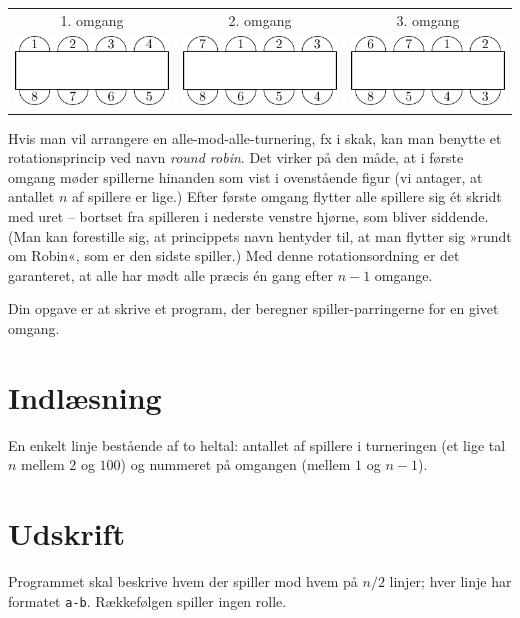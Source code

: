 
\begin{tabular}{ccc}
  1. omgang & 2. omgang & 3. omgang\\[1ex]
  \includegraphics{img/turnering-img-1.pdf} &
  \includegraphics{img/turnering-img-2.pdf} &
  \includegraphics{img/turnering-img-3.pdf} 
\end{tabular}
\bigskip

Hvis man vil arrangere en alle-mod-alle-turnering, fx i skak, kan man benytte et rotationsprincip ved navn \emph{round robin}.
Det virker på den måde, at i første omgang møder spillerne hinanden som vist i ovenstående figur (vi antager, at antallet $n$ af spillere er lige.)
Efter første omgang flytter alle spillere sig ét skridt med uret -- bortset fra spilleren i nederste venstre hjørne, som bliver siddende.
(Man kan forestille sig, at princippets navn hentyder til, at man flytter sig »rundt om Robin«, som er den sidste spiller.) 
Med denne rotationsordning er det garanteret, at alle har mødt alle præcis én gang efter $n-1$ omgange.

Din opgave er at skrive et program, der beregner spiller-parringerne for en givet omgang.

\section*{Indlæsning}
En enkelt linje bestående af to heltal: antallet af spillere i turneringen (et lige tal $n$ mellem $2$ og $100$) og nummeret på omgangen (mellem $1$ og $n-1$).

\section*{Udskrift}

Programmet skal beskrive hvem der spiller mod hvem på $n/2$ linjer; hver linje har formatet \texttt{a-b}.
Rækkefølgen spiller ingen rolle.
